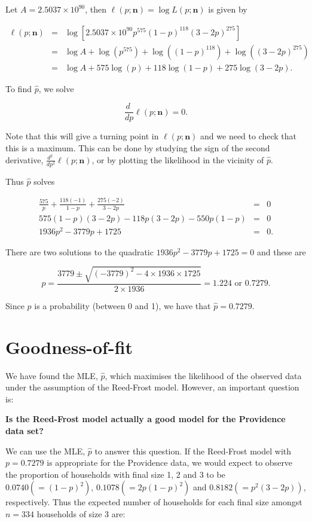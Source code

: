 \documentclass[
]{book}
\begin{document}
Let \(A = 2.5037 \times 10^{90}\), then \(\ell (p; \mathbf{n}) = \log L (p; \mathbf{n})\) is given by

\begin{eqnarray}
\ell (p; \mathbf{n}) &=& \log \left[ 2.5037 \times 10^{90} p^{575} (1-p)^{118} (3-2p)^{275} \right] \\
&=& \log A + \log \left( p^{575}\right) + \log \left((1-p)^{118} \right) + \log \left((3-2p)^{275} \right) \\
&=& \log A + 575 \log (p) + 118 \log (1-p) + 275 \log (3-2p).
\end{eqnarray}

To find \(\hat{p}\), we solve

\[ \frac{d \;}{dp}\ell(p; \mathbf{n})=0. \]

Note that this will give a turning point in \(\ell(p; \mathbf{n})\) and we need to check that this is a maximum. This can be done by studying the sign of the second derivative, \(\frac{d^2 \;}{dp^2}\ell(p; \mathbf{n})\), or by plotting the likelihood in the vicinity of \(\hat{p}\).

Thus \(\hat{p}\) solves

\begin{eqnarray}
\frac{575}{p} + \frac{118(-1)}{1-p} + \frac{275(-2)}{3-2p} &=& 0 \\
575 (1-p)(3-2p) -118 p (3-2p) - 550 p (1-p) &=& 0 \\
1936 p^2 -3779 p + 1725 &=& 0.
\end{eqnarray}

There are two solutions to the quadratic \(1936 p^2 - 3779 p + 1725 =0\) and these are

\[ p = \frac{3779 \pm \sqrt{(-3779)^2-4 \times 1936 \times 1725}}{2 \times 1936} = 1.224 \mbox{ or } 0.7279. \]

Since \(p\) is a probability (between 0 and 1), we have that \(\hat{p} = 0.7279\).

\hypertarget{sec_GoF}{%
\section{Goodness-of-fit}\label{sec_GoF}}

We have found the MLE, \(\hat{p}\), which maximises the likelihood of the observed data under the assumption of the Reed-Frost model. However, an important question is:

{\textbf{Is the Reed-Frost model actually a good model for the Providence data set?}}

We can use the MLE, \(\hat{p}\) to answer this question. If the Reed-Frost model with \(p = 0.7279\) is appropriate for the Providence data, we would expect to observe the proportion of households with final size 1, 2 and 3 to be \(0.0740 (=(1-p)^2)\), \(0.1078 (=2 p (1-p)^2)\) and \(0.8182 (=p^2 (3-2p))\), respectively. Thus the expected number of households for each final size amongst \(n=334\) households of size 3 are:
\end{document}
